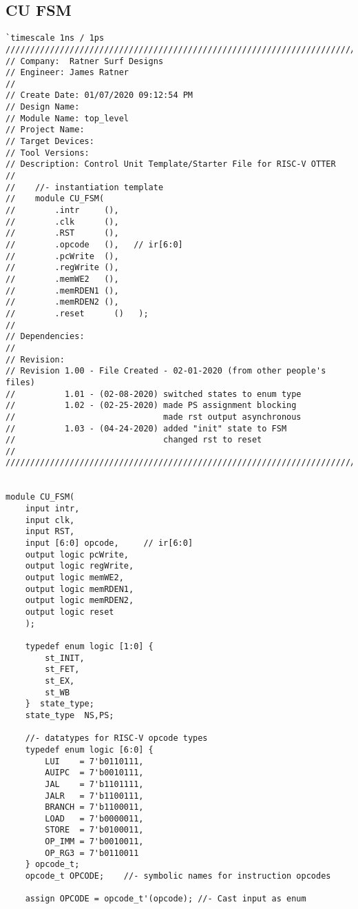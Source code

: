 \documentclass{article}
\begin{document}
\pagebreak

\subsection{CU FSM}

\begin{verbatim}
`timescale 1ns / 1ps
//////////////////////////////////////////////////////////////////////////////////
// Company:  Ratner Surf Designs
// Engineer: James Ratner
// 
// Create Date: 01/07/2020 09:12:54 PM
// Design Name: 
// Module Name: top_level
// Project Name: 
// Target Devices: 
// Tool Versions: 
// Description: Control Unit Template/Starter File for RISC-V OTTER
//
//    //- instantiation template 
//    module CU_FSM(
//        .intr     (),
//        .clk      (),
//        .RST      (),
//        .opcode   (),   // ir[6:0]
//        .pcWrite  (),
//        .regWrite (),
//        .memWE2   (),
//        .memRDEN1 (),
//        .memRDEN2 (),
//        .reset      ()   );
//   
// Dependencies: 
// 
// Revision:
// Revision 1.00 - File Created - 02-01-2020 (from other people's files)
//          1.01 - (02-08-2020) switched states to enum type
//          1.02 - (02-25-2020) made PS assignment blocking
//                              made rst output asynchronous
//          1.03 - (04-24-2020) added "init" state to FSM
//                              changed rst to reset
// 
//////////////////////////////////////////////////////////////////////////////////


module CU_FSM(
    input intr,
    input clk,
    input RST,
    input [6:0] opcode,     // ir[6:0]
    output logic pcWrite,
    output logic regWrite,
    output logic memWE2,
    output logic memRDEN1,
    output logic memRDEN2,
    output logic reset
    );
    
    typedef enum logic [1:0] {
        st_INIT,
        st_FET,
        st_EX,
        st_WB
    }  state_type; 
    state_type  NS,PS; 
        
    //- datatypes for RISC-V opcode types
    typedef enum logic [6:0] {
        LUI    = 7'b0110111,
        AUIPC  = 7'b0010111,
        JAL    = 7'b1101111,
        JALR   = 7'b1100111,
        BRANCH = 7'b1100011,
        LOAD   = 7'b0000011,
        STORE  = 7'b0100011,
        OP_IMM = 7'b0010011,
        OP_RG3 = 7'b0110011
    } opcode_t;
    opcode_t OPCODE;    //- symbolic names for instruction opcodes
        
    assign OPCODE = opcode_t'(opcode); //- Cast input as enum 
        


\end{verbatim}
\end{document}
